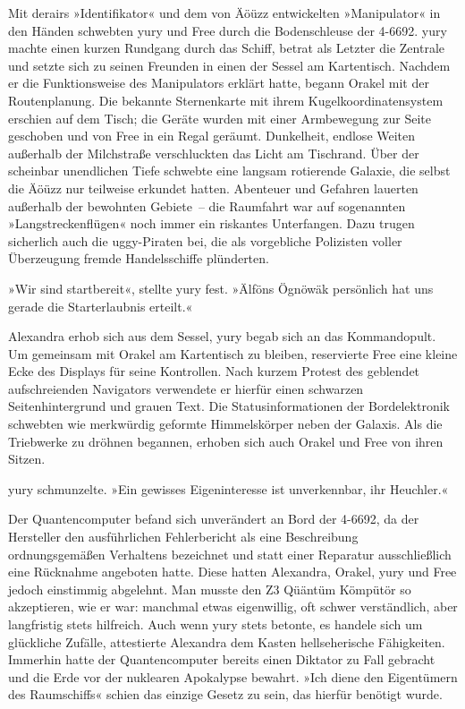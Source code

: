 Mit derairs »Identifikator« und dem von Äöüzz entwickelten »Manipulator« in den Händen schwebten yury und Free durch die Bodenschleuse der 4-6692. yury machte einen kurzen Rundgang durch das Schiff, betrat als Letzter die Zentrale und setzte sich zu seinen Freunden in einen der Sessel am Kartentisch. Nachdem er die Funktionsweise des Manipulators erklärt hatte, begann Orakel mit der Routenplanung. Die bekannte Sternenkarte mit ihrem Kugelkoordinatensystem erschien auf dem Tisch; die Geräte wurden mit einer Armbewegung zur Seite geschoben und von Free in ein Regal geräumt. Dunkelheit, endlose Weiten außerhalb der Milchstraße verschluckten das Licht am Tischrand. Über der scheinbar unendlichen Tiefe schwebte eine langsam rotierende Galaxie, die selbst die Äöüzz nur teilweise erkundet hatten. Abenteuer und Gefahren lauerten außerhalb der bewohnten Gebiete~– die Raumfahrt war auf sogenannten »Langstreckenflügen« noch immer ein riskantes Unterfangen. Dazu trugen sicherlich auch die uggy-Piraten bei, die als vorgebliche Polizisten voller Überzeugung fremde Handelsschiffe plünderten.

»Wir sind startbereit«, stellte yury fest. »Älföns Ögnöwäk persönlich hat uns gerade die Starterlaubnis erteilt.«

Alexandra erhob sich aus dem Sessel, yury begab sich an das Kommandopult. Um gemeinsam mit Orakel am Kartentisch zu bleiben, reservierte Free eine kleine Ecke des Displays für seine Kontrollen. Nach kurzem Protest des geblendet aufschreienden Navigators verwendete er hierfür einen schwarzen Seitenhintergrund und grauen Text. Die Statusinformationen der Bordelektronik schwebten wie merkwürdig geformte Himmelskörper neben der Galaxis. Als die Triebwerke zu dröhnen begannen, erhoben sich auch Orakel und Free von ihren Sitzen.


yury schmunzelte. »Ein gewisses Eigeninteresse ist unverkennbar, ihr Heuchler.«


Der Quantencomputer befand sich unverändert an Bord der 4-6692, da der Hersteller den ausführlichen Fehlerbericht als eine Beschreibung ordnungsgemäßen Verhaltens bezeichnet und statt einer Reparatur ausschließlich eine Rücknahme angeboten hatte. Diese hatten Alexandra, Orakel, yury und Free jedoch einstimmig abgelehnt. Man musste den Z3 Qüäntüm Kömpütör so akzeptieren, wie er war: manchmal etwas eigenwillig, oft schwer verständlich, aber langfristig stets hilfreich. Auch wenn yury stets betonte, es handele sich um glückliche Zufälle, attestierte Alexandra dem Kasten hellseherische Fähigkeiten. Immerhin hatte der Quantencomputer bereits einen Diktator zu Fall gebracht und die Erde vor der nuklearen Apokalypse bewahrt. »Ich diene den Eigentümern des Raumschiffs« schien das einzige Gesetz zu sein, das hierfür benötigt wurde.

